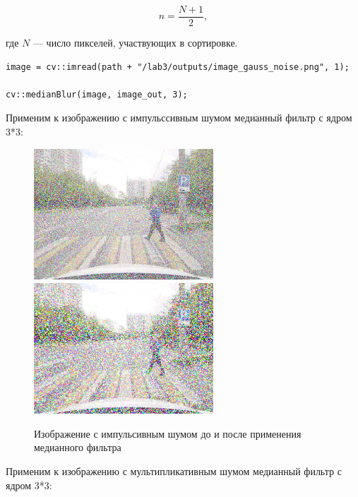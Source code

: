 \begin{equation}
    n = \frac{N + 1}{2},
\label{eq:complex_func}
\end{equation}

где $N$ — число пикселей, участвующих в сортировке.

\begin{lstlisting}[style=cpp_white, caption={Исходный код медианного фильтра}]
image = cv::imread(path + "/lab3/outputs/image_gauss_noise.png", 1);

cv::medianBlur(image, image_out, 3);
\end{lstlisting}
\pagebreak

Применим к изображению с импульссивным шумом медианный фильтр с ядром 3*3:

\begin{figure}[hbt!]
    \centering
    \includegraphics[width=0.6\textwidth]{../outputs/image_impulse_noise.png}
    \includegraphics[width=0.6\textwidth]{../addition/image_impulse_median_filter_k3.png}
    \caption{Изображение с импульсивным шумом до и после применения медианного фильтра}
    \label{fig:stich_images}
\end{figure}

Применим к изображению с мультипликативным шумом медианный фильтр с ядром 3*3:


